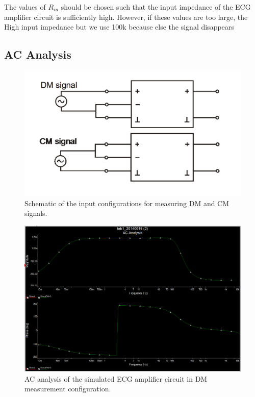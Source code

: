 \documentclass[pdftex,12pt,letterpaper]{article}
\begin{document}
The values of $R_{in}$ should be chosen such that the input impedance of the ECG amplifier circuit is sufficiently high. However, if these values are too large, the 
High input impedance but we use 100k because else the signal disappears

\subsection{AC Analysis}

\begin{figure}[H]
\begin{center}
\includegraphics[scale=.5]{DM_CM.png}
\caption{Schematic of the input configurations for measuring DM and CM signals.}
\label{fig:DM_CM}
\end{center}
\end{figure}

\begin{figure}[H]
\begin{center}
\includegraphics[scale=.35]{DM_analysis.png}
\caption{AC analysis of the simulated ECG amplifier circuit in DM measurement configuration.}
\label{fig:DM}
\end{center}
\end{figure}
\end{document}
